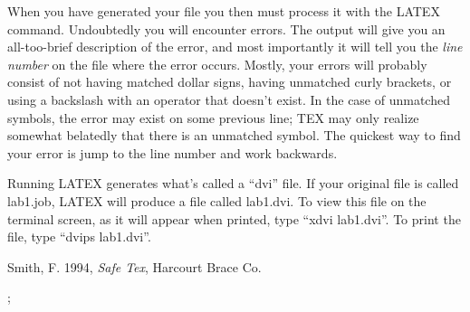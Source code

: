 	When you have generated your file you then must process it with
the LATEX command.  Undoubtedly you will encounter errors.  The output
will give you an all-too-brief description of the error, and most
importantly it will tell you the {\it line number} on the file where the
error occurs.  Mostly, your errors will probably consist of not having
matched dollar signs, having unmatched curly brackets, or using a
backslash with an operator that doesn't exist.  In the case of unmatched
symbols, the error may exist on some previous line; TEX may only realize
somewhat belatedly that there is an unmatched symbol.  The quickest way
to find your error is jump to the line number and work backwards.

	Running LATEX generates what's called a ``dvi'' file. If your
original file is called lab1.job, LATEX will produce a file called
lab1.dvi. To view this file on the terminal screen,
as it will appear when printed, type ``xdvi
lab1.dvi''. To print the file, type ``dvips lab1.dvi''.

\clearpage

\begin{references}

 Smith, F. 1994, {\it Safe Tex}, Harcourt Brace Co.

\end{references}

;\clearpage



